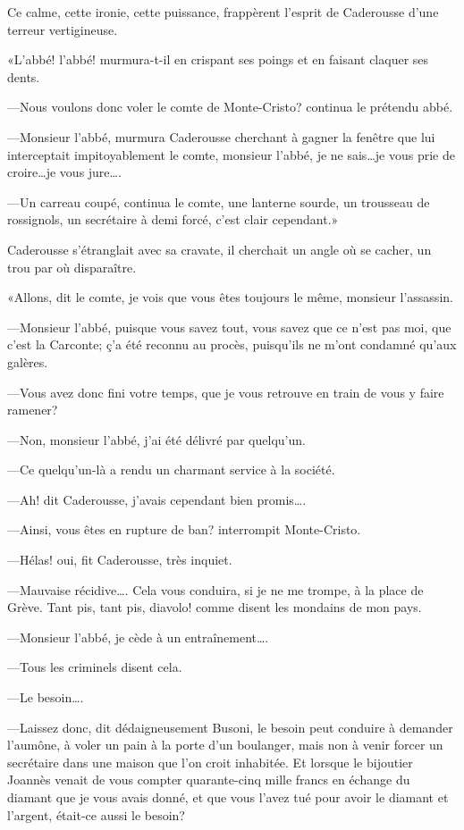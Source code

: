 Ce calme, cette ironie, cette puissance, frappèrent l'esprit de Caderousse d'une terreur vertigineuse. 

«L'abbé! l'abbé! murmura-t-il en crispant ses poings et en faisant claquer ses dents. 

—Nous voulons donc voler le comte de Monte-Cristo? continua le prétendu abbé. 

—Monsieur l'abbé, murmura Caderousse cherchant à gagner la fenêtre que lui interceptait impitoyablement le comte, monsieur l'abbé, je ne sais\dots je vous prie de croire\dots je vous jure\dots. 

—Un carreau coupé, continua le comte, une lanterne sourde, un trousseau de rossignols, un secrétaire à demi forcé, c'est clair cependant.» 

Caderousse s'étranglait avec sa cravate, il cherchait un angle où se cacher, un trou par où disparaître. 

«Allons, dit le comte, je vois que vous êtes toujours le même, monsieur l'assassin. 

—Monsieur l'abbé, puisque vous savez tout, vous savez que ce n'est pas moi, que c'est la Carconte; ç'a été reconnu au procès, puisqu'ils ne m'ont condamné qu'aux galères. 

—Vous avez donc fini votre temps, que je vous retrouve en train de vous y faire ramener? 

—Non, monsieur l'abbé, j'ai été délivré par quelqu'un. 

—Ce quelqu'un-là a rendu un charmant service à la société. 

—Ah! dit Caderousse, j'avais cependant bien promis\dots. 

—Ainsi, vous êtes en rupture de ban? interrompit Monte-Cristo. 

—Hélas! oui, fit Caderousse, très inquiet. 

—Mauvaise récidive\dots. Cela vous conduira, si je ne me trompe, à la place de Grève. Tant pis, tant pis, diavolo! comme disent les mondains de mon pays. 

—Monsieur l'abbé, je cède à un entraînement\dots. 

—Tous les criminels disent cela. 

—Le besoin\dots. 

—Laissez donc, dit dédaigneusement Busoni, le besoin peut conduire à demander l'aumône, à voler un pain à la porte d'un boulanger, mais non à venir forcer un secrétaire dans une maison que l'on croit inhabitée. Et lorsque le bijoutier Joannès venait de vous compter quarante-cinq mille francs en échange du diamant que je vous avais donné, et que vous l'avez tué pour avoir le diamant et l'argent, était-ce aussi le besoin? 

